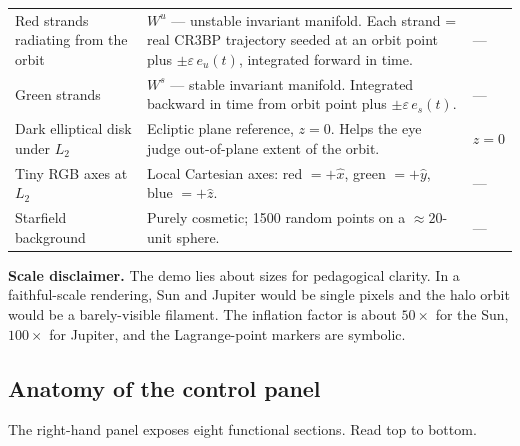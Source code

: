 \documentclass[11pt,a4paper]{article}
\begin{document}
\begin{table}[H]
\begin{tabularx}{\textwidth}{@{}l X l@{}}
Red strands radiating from the orbit & $W^u$ --- unstable invariant manifold. Each strand = real CR3BP trajectory seeded at an orbit point plus $\pm\varepsilon\,e_u(t)$, integrated forward in time. & --- \\
Green strands & $W^s$ --- stable invariant manifold. Integrated backward in time from orbit point plus $\pm\varepsilon\,e_s(t)$. & --- \\
Dark elliptical disk under $L_2$ & Ecliptic plane reference, $z=0$. Helps the eye judge out-of-plane extent of the orbit. & $z = 0$ \\
Tiny RGB axes at $L_2$ & Local Cartesian axes: red $= +\hat x$, green $= +\hat y$, blue $= +\hat z$. & --- \\
Starfield background & Purely cosmetic; 1500 random points on a $\approx 20$-unit sphere. & --- \\
\bottomrule
\end{tabularx}
\end{table}

\textbf{Scale disclaimer.} The demo lies about sizes for pedagogical clarity. In a faithful-scale rendering, Sun and Jupiter would be single pixels and the halo orbit would be a barely-visible filament. The inflation factor is about $50\times$ for the Sun, $100\times$ for Jupiter, and the Lagrange-point markers are symbolic.

\subsection{Anatomy of the control panel}\label{sec:demo:panel}

The right-hand panel exposes eight functional sections. Read top to bottom.
\end{document}
